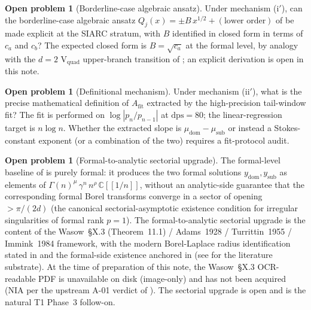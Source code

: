 \documentclass[11pt,reqno]{amsart}
\theoremstyle{plain}
\theoremstyle{definition}
\newtheorem{problem}[theorem]{Open problem}
\theoremstyle{remark}
\newcommand{\dps}{\mathrm{dps}}
\newcommand{\Afit}{A_{\mathrm{fit}}}
\begin{document}
\begin{problem}[Borderline-case algebraic ansatz]
\label{q:borderline-Q}
Under mechanism (i$'$), can the borderline-case algebraic
ansatz
$Q_j(x) = \pm B\,x^{1/2} + (\text{lower order})$
of \cite[\S1]{birkhoff_trjitzinsky_1933} be made explicit at
the SIARC stratum, with $B$ identified in closed form in terms
of $c_a$ and $c_b$? The expected closed form is
$B = \sqrt{c_a}$ at the formal level, by analogy with the
$d = 2$ V$_{\mathrm{quad}}$ upper-branch transition of
\cite[\S6]{papanokechi_pcf1_v13}; an explicit derivation is
open in this note.
\end{problem}

\begin{problem}[Definitional mechanism]
\label{q:Afit-def}
Under mechanism (ii$'$), what is the precise mathematical
definition of $\Afit$ extracted by the
\cite{papanokechi_pcf2_v13} high-precision tail-window fit?
The fit is performed on $\log|p_n / p_{n-1}|$ at $\dps = 80$;
the linear-regression target is $n \log n$. Whether the
extracted slope is $\mu_{\mathrm{dom}} - \mu_{\mathrm{sub}}$
or instead a Stokes-constant exponent (or a combination of
the two) requires a fit-protocol audit.
\end{problem}

\begin{problem}[Formal-to-analytic sectorial upgrade]
\label{q:sectorial}
The formal-level baseline of  is purely
formal: it produces the two formal solutions
$y_{\mathrm{dom}}, y_{\mathrm{sub}}$ as elements of
$\Gamma(n)^{\mu}\,\gamma^{n}\,n^{\rho}\,\mathbb{C}[[1/n]]$,
without an analytic-side guarantee that the corresponding
formal Borel transforms converge in a sector of opening
$> \pi/(2d)$ (the canonical sectorial-asymptotic existence
condition for irregular singularities of formal rank $p = 1$).
The formal-to-analytic sectorial upgrade is the content of
the Wasow~\S X.3 (Theorem~11.1) \cite{wasow1965asymptotic} /
Adams~1928 \cite{adams1928analytic} /
Turrittin~1955 \cite{turrittin1955convergent} /
Immink~1984 \cite{immink1984asymptotics} framework, with the
modern Borel-Laplace radius identification stated in
\cite[ch.~5]{costin2008asymptotics} and the formal-side
existence anchored in \cite[\S2]{birkhoff1930formal}
(see \cite[Phase~D]{siarc_t1_phase2} for the literature
substrate).
At the time of preparation of this note, the
Wasow~\S X.3 OCR-readable PDF is unavailable on disk
(image-only) and \cite{adams1928analytic} has not been
acquired (NIA per the upstream A-01 verdict of
\cite{siarc_t1_phase2}).
The sectorial upgrade is open and is the natural T1 Phase~3
follow-on.
\end{problem}
\end{document}
